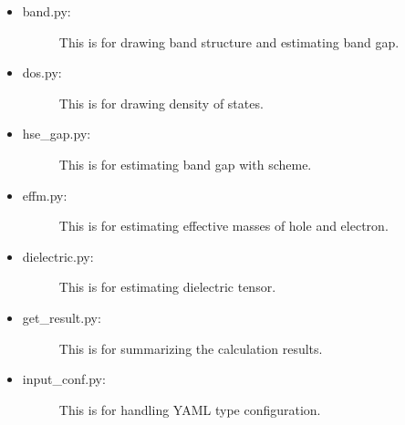 \documentclass[letterpaper,10pt,english]{sphinxmanual}
\begin{document}
\begin{itemize}
\item {} \begin{description}
\item[{band.py:}] \leavevmode
This is for drawing band structure and estimating band gap.

\end{description}

\item {} \begin{description}
\item[{dos.py:}] \leavevmode
This is for drawing density of states.

\end{description}

\item {} \begin{description}
\item[{hse\_gap.py:}] \leavevmode
This is for estimating band gap with  scheme.

\end{description}

\item {} \begin{description}
\item[{effm.py:}] \leavevmode
This is for estimating effective masses of hole and electron.

\end{description}

\item {} \begin{description}
\item[{dielectric.py:}] \leavevmode
This is for estimating dielectric tensor.

\end{description}

\item {} \begin{description}
\item[{get\_result.py:}] \leavevmode
This is for summarizing the calculation results.

\end{description}

\item {} \begin{description}
\item[{input\_conf.py:}] \leavevmode
This is for handling YAML type configuration.

\end{description}


\end{itemize}
\end{document}
